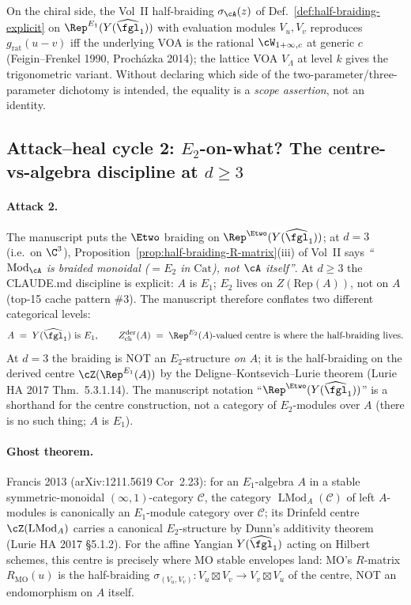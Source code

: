 \begin{remark}
On the chiral side, the Vol~II half-braiding
$\sigma_\cA(z)$ of Def.~\ref{def:half-braiding-explicit} on
$\Rep^{E_1}(Y(\widehat{\fgl}_1))$ with evaluation modules $V_u, V_v$
reproduces $g_{\mathrm{rat}}(u - v)$ iff the underlying VOA is the
rational $\cW_{1+\infty,c}$ at generic $c$ (Feigin--Frenkel 1990,
Proch\'azka 2014); the lattice VOA $V_{\Lambda}$ at level $k$ gives
the trigonometric variant.  Without declaring which side of the
two-parameter/three-parameter dichotomy is intended, the equality is a
\emph{scope assertion}, not an identity.
\end{remark}

\subsection*{Attack--heal cycle 2: $E_2$-on-what?  The
centre-vs-algebra discipline at $d \geq 3$}

\paragraph{Attack 2.}  The manuscript puts the $\Etwo$ braiding on
$\Rep^{\Etwo}(Y(\widehat{\fgl}_1))$; at $d = 3$ (i.e.\ on $\C^3$),
Proposition~\ref{prop:half-braiding-R-matrix}(iii) of Vol~II says
\emph{``$\mathrm{Mod}_\cA$ is braided monoidal ($=E_2$ in $\mathrm{Cat}$),
not $\cA$ itself''}.  At $d\geq 3$ the CLAUDE.md discipline is explicit:
$A$ is $E_1$; $E_2$ lives on $Z(\mathrm{Rep}(A))$, not on $A$ (top-15
cache pattern \#3).  The manuscript therefore conflates two different
categorical levels:
\[
A \;=\; Y(\widehat{\fgl}_1) \text{ is } E_1,
\qquad
Z^{\mathrm{der}}_{\mathrm{ch}}(A) \;=\; \Rep^{E_2}(A)\text{-valued centre}
\text{ is where the half-braiding lives.}
\]
At $d=3$ the braiding is NOT an $E_2$-structure \emph{on $A$}; it is
the half-braiding on the derived centre $\cZ(\Rep^{E_1}(A))$ by the
Deligne--Kontsevich--Lurie theorem (Lurie HA 2017 Thm.~5.3.1.14).  The
manuscript notation ``$\Rep^{\Etwo}(Y(\widehat{\fgl}_1))$'' is a
shorthand for the centre construction, not a category of $E_2$-modules
over $A$ (there is no such thing; $A$ is $E_1$).

\paragraph{Ghost theorem.}  Francis 2013 (arXiv:1211.5619 Cor~2.23):
for an $E_1$-algebra $A$ in a stable symmetric-monoidal
$(\infty,1)$-category $\mathcal C$, the category $\operatorname{LMod}_A(\mathcal C)$
of left $A$-modules is canonically an $E_1$-module category over $\mathcal C$;
its Drinfeld centre $\cZ(\operatorname{LMod}_A)$ carries a canonical $E_2$-structure
by Dunn's additivity theorem (Lurie HA 2017 \S5.1.2).  For the
affine Yangian $Y(\widehat{\fgl}_1)$ acting on Hilbert schemes, this
centre is precisely where MO stable envelopes land: MO's $R$-matrix
$R_{\mathrm{MO}}(u)$ is the half-braiding
$\sigma_{(V_u, V_v)}\colon V_u \boxtimes V_v \to V_v \boxtimes V_u$
of the centre, NOT an endomorphism on $A$ itself.

